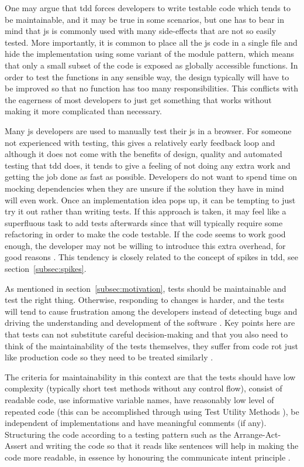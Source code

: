 \documentclass[11pt]{article}
\begin{document}
One may argue that \gls{tdd} forces developers to write testable code which tends to be maintainable, and it may be true in some scenarios, but one has to bear in mind that \gls{js} is commonly used with many side-effects that are not so easily tested. More importantly, it is common to place all the \gls{js} code in a single file and hide the implementation using some variant of the module pattern\cite[p.~40]{GoodParts}, which means that only a small subset of the code is exposed as globally accessible functions. In order to test the functions in any sensible way, the design typically will have to be improved so that no function has too many responsibilities. This conflicts with the eagerness of most developers to just get something that works without making it more complicated than necessary.

Many \gls{js} developers are used to manually test their \gls{js} in a browser. For someone not experienced with testing, this gives a relatively early feedback loop and although it does not come with the benefits of design, quality and automated testing that \gls{tdd} does, it tends to give a feeling of not doing any extra work and getting the job done as fast as possible. Developers do not want to spend time on mocking dependencies when they are unsure if the solution they have in mind will even work. Once an implementation idea pops up, it can be tempting to just try it out rather than writing tests. If this approach is taken, it may feel like a superfluous task to add tests afterwards since that will typically require some refactoring in order to make the code testable. If the code seems to work good enough, the developer may not be willing to introduce this extra overhead, for good reasons \cite[question~43]{Stenmark}. This tendency is closely related to the concept of spikes in \gls{tdd}, see section~\ref{subsec:spikes}.

As mentioned in section~\ref{subsec:motivation}, tests should be maintainable and test the right thing. Otherwise, responding to changes is harder, and the tests will tend to cause frustration among the developers instead of detecting bugs and driving the understanding and development of the software \cite{Clean}. Key points here are that tests can not substitute careful decision-making and that you also need to think of the maintainability of the tests themselves, they suffer from code rot just like production code so they need to be treated similarly \cite[question~36]{Ahnve}\cite[p.~123-133]{Clean}.

The criteria for maintainability in this context are that the tests should have low complexity (typically short test methods without any control flow), consist of readable code, use informative variable names, have reasonably low level of repeated code (this can be accomplished through using Test Utility Methods \cite[599]{TestPatterns}), be independent of implementations and have meaningful comments (if any). Structuring the code according to a testing pattern such as the Arrange-Act-Assert \cite{C2} and writing the code so that it reads like sentences will help in making the code more readable, in essence by honouring the communicate intent principle \cite[p.~41]{TestPatterns}.
\end{document}
